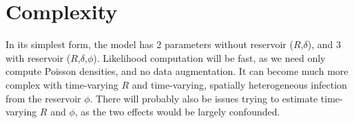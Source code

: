 \documentclass[a4paper,11pt]{article}
\begin{document}
\section{Complexity}

In its simplest form, the model has 2 parameters without reservoir 
($R$,$\delta$), and 3 with 
reservoir ($R$,$\delta$,$\phi$).
Likelihood computation will be fast, as we need only compute Poisson densities, 
and no data augmentation.
It can become much more complex with time-varying $R$ and time-varying, 
spatially heterogeneous infection from the reservoir $\phi$.
There will probably also be issues trying to estimate time-varying $R$ and 
$\phi$, as the two effects would be largely confounded.
\end{document}

